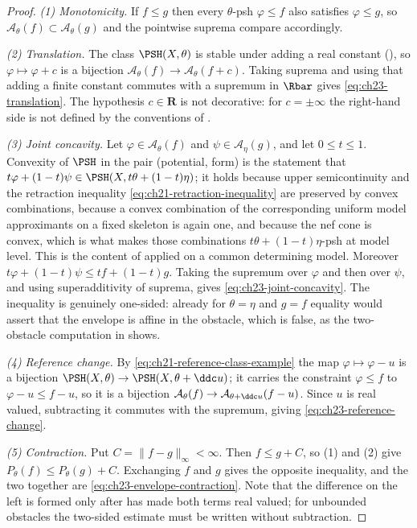 \begin{proof}
\emph{(1) Monotonicity.}  If \(f\leq g\) then every \(\theta\)-psh
\(\varphi\leq f\) also satisfies \(\varphi\leq g\), so
\(\mathcal A_\theta(f)\subset\mathcal A_\theta(g)\) and the pointwise
suprema compare accordingly.

\emph{(2) Translation.}  The class \(\PSH(X,\theta)\) is stable under adding
a real constant (), so
\(\varphi\mapsto\varphi+c\) is a bijection
\(\mathcal A_\theta(f)\to\mathcal A_\theta(f+c)\).  Taking suprema and using
that adding a finite constant commutes with a supremum in \(\Rbar\) gives
\eqref{eq:ch23-translation}.  The hypothesis \(c\in\mathbf R\) is not
decorative: for \(c=\pm\infty\) the right-hand side is not defined by the
conventions of .

\emph{(3) Joint concavity.}  Let \(\varphi\in\mathcal A_\theta(f)\) and
\(\psi\in\mathcal A_\eta(g)\), and let \(0\leq t\leq1\).  Convexity of
\(\PSH\) in the pair (potential, form) is the statement that
\(t\varphi+(1-t)\psi\in\PSH(X,t\theta+(1-t)\eta)\); it holds because upper
semicontinuity and the retraction inequality
\eqref{eq:ch21-retraction-inequality} are preserved by convex combinations,
because a convex combination of the corresponding uniform model approximants
on a fixed skeleton is again one, and because the nef cone is convex, which
is what makes those combinations \(t\theta+(1-t)\eta\)-psh at model level.
This is the content of  applied on a
common determining model.  Moreover
\(t\varphi+(1-t)\psi\leq tf+(1-t)g\).  Taking the supremum over
\(\varphi\) and then over \(\psi\), and using superadditivity of suprema,
gives \eqref{eq:ch23-joint-concavity}.  The inequality is genuinely one-sided:
already for \(\theta=\eta\) and \(g=f\) equality would assert that the
envelope is affine in the obstacle, which is false, as the two-obstacle
computation in  shows.

\emph{(4) Reference change.}  By
\eqref{eq:ch21-reference-class-example} the map \(\varphi\mapsto\varphi-u\)
is a bijection
\(\PSH(X,\theta)\to\PSH(X,\theta+\ddc u)\); it carries the constraint
\(\varphi\leq f\) to \(\varphi-u\leq f-u\), so it is a bijection
\(\mathcal A_\theta(f)\to\mathcal A_{\theta+\ddc u}(f-u)\).  Since \(u\) is
real valued, subtracting it commutes with the supremum, giving
\eqref{eq:ch23-reference-change}.

\emph{(5) Contraction.}  Put \(C=\|f-g\|_\infty<\infty\).  Then \(f\leq g+C\),
so (1) and (2) give \(P_\theta(f)\leq P_\theta(g)+C\).  Exchanging \(f\) and
\(g\) gives the opposite inequality, and the two together are
\eqref{eq:ch23-envelope-contraction}.  Note that the difference on the left
is formed only after  has made both terms
real valued; for unbounded obstacles the two-sided estimate must be written
without subtraction.


\end{proof}
